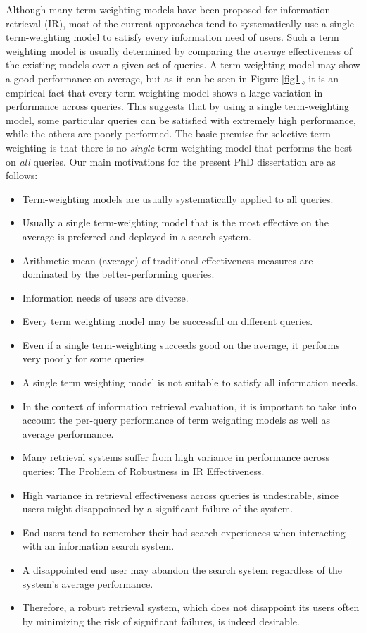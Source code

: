 Although many term-weighting models have been proposed for information retrieval (IR), most of the current approaches tend to systematically use a single term-weighting model to satisfy every information need of users.
Such a term weighting model is usually determined by comparing the \emph{average} effectiveness of the existing models over a given set of queries.
A term-weighting model may show a good performance on average, but as it can be seen in Figure \ref{fig1}, it is an empirical fact that every term-weighting model shows a large variation in performance across queries. 
This suggests that by using a single term-weighting model, some particular queries can be satisfied with extremely high performance, while the others are poorly performed.
The basic premise for selective term-weighting is that there is no \emph{single} term-weighting model that performs the best on \emph{all} queries.
Our main motivations for the present PhD dissertation are as follows: 

\begin{itemize}
  \item Term-weighting models are usually systematically applied to all queries.
  \item Usually a single term-weighting model that is the most effective on the average is preferred and deployed in a search system.
  \item Arithmetic mean (average) of traditional effectiveness measures are dominated by the better-performing queries.
  \item Information needs of users are diverse.
  \item Every term weighting model may be successful on different queries.
  \item Even if a single term-weighting succeeds good on the average, it performs very poorly for some queries.
  \item A single term weighting model is not suitable to satisfy all information needs.
  \item In the context of information retrieval evaluation, it is important to take into account the per-query performance of term weighting models as well as average performance.
  \item Many retrieval systems suffer from high variance in performance across queries: The Problem of Robustness in IR Effectiveness.
  \item High variance in retrieval effectiveness across queries is undesirable, since users might disappointed by a significant failure of the system.
  \item End users tend to remember their bad search experiences when interacting with an information search system. 
  \item A disappointed end user may abandon the search system regardless of the system's average performance.
  \item Therefore, a robust retrieval system, which does not disappoint its users often by minimizing the risk of significant failures, is indeed desirable.
\end{itemize}

